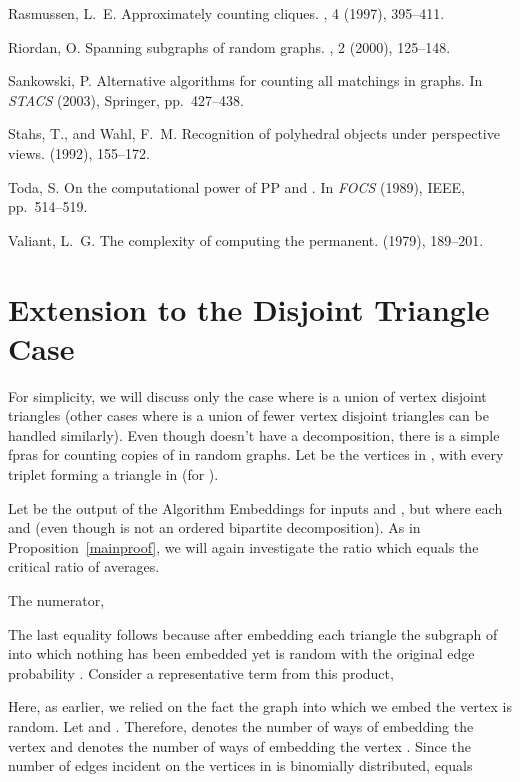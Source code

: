 \documentclass[11pt]{article}
\begin{document}
\begin{thebibliography}{10}
{\sc Rasmussen, L.~E.}
\newblock Approximately counting cliques.
, 4 (1997), 395--411.

{\sc Riordan, O.}
\newblock Spanning subgraphs of random graphs.
, 2 (2000), 125--148.

{\sc Sankowski, P.}
\newblock Alternative algorithms for counting all matchings in graphs.
\newblock In {\em STACS\/} (2003), Springer, pp.~427--438.

{\sc Stahs, T., and Wahl, F.~M.}
\newblock Recognition of polyhedral objects under perspective views.
 (1992), 155--172.

{\sc Toda, S.}
\newblock On the computational power of {PP} and {}.
\newblock In {\em FOCS\/} (1989), IEEE, pp.~514--519.

{\sc Valiant, L.~G.}
\newblock The complexity of computing the permanent.
 (1979), 189--201.

\end{thebibliography}


\appendix
\section{Extension to the Disjoint Triangle Case} \label{app:app2}
For simplicity, we will discuss only the case where  is a union of  vertex disjoint triangles (other cases where  is a union of fewer vertex disjoint triangles can be handled similarly). Even though  doesn't have a decomposition, there is a simple fpras for counting copies of  in random graphs. Let  be the vertices in , with every triplet  forming a triangle in  (for ). 

Let  be the output of the Algorithm Embeddings for inputs  and , but where each  and  (even though  is not an ordered bipartite decomposition). As in Proposition~\ref{mainproof}, we will again investigate the ratio  which equals the critical ratio of averages. 

The numerator, 

The last equality follows because after embedding each triangle the subgraph of  into which nothing has been embedded yet is random with the original edge probability . Consider a representative term from this product,  

Here, as earlier, we relied on the fact the graph into which we embed the vertex  is random. Let  and .  Therefore,  denotes the number of ways of embedding the vertex  and  denotes the number of ways of embedding the vertex . Since the number of edges incident on the vertices in  is binomially distributed,  equals 
\end{document}
